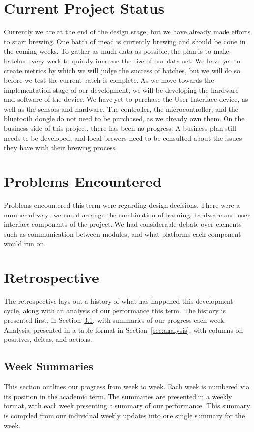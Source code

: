 \documentclass[draftclsnofoot,onecolumn,letterpaper,10pt]{IEEEtran}
\begin{document}
\section{Current Project Status}%
Currently we are at the end of the design stage, but we have already made efforts to start brewing.
One batch of mead is currently brewing and should be done in the coming weeks.
To gather as much data as possible, the plan is to make batches every week to quickly increase the size of our data set.
We have yet to create metrics by which we will judge the success of batches, but we will do so before we test the current batch is complete.
As we move towards the implementation stage of our development, we will be developing the hardware and software of the device.
We have yet to purchase the User Interface device, as well as the sensors and hardware.
The controller, the microcontroller, and the bluetooth dongle do not need to be purchased, as we already own them.
On the business side of this project, there has been no progress.
A business plan still needs to be developed, and local brewers need to be consulted about the issues they have with their brewing process.


\section{Problems Encountered}%
Problems encountered this term were regarding design decisions.
There were a number of ways we could arrange the combination of learning, hardware and user interface components of the project.
We had considerable debate over elements such as communication between modules, and what platforms each component would run on.

\section{Retrospective}
The retrospective lays out a history of what has happened this development cycle, along with an analysis of our performance this term.
The history is presented first, in Section~\ref{sec:weekSummaries}, with summaries of our progress each week.
Analysis, presented in a table format in Section~\ref{sec:analysis}, with columns on positives, deltas, and actions.

\subsection{Week Summaries}\label{sec:weekSummaries}
This section outlines our progress from week to week.
Each week is numbered via its position in the academic term.
The summaries are presented in a weekly format, with each week presenting a summary of our performance.
This summary is compiled from our individual weekly updates into one single summary for the week. %
\end{document}
